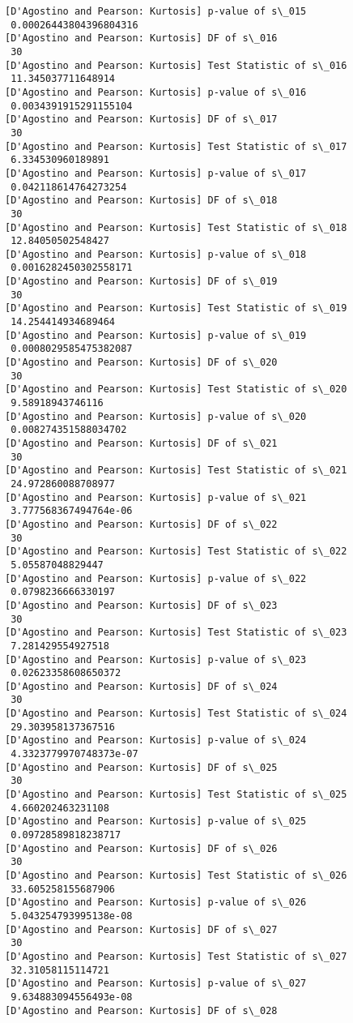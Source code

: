 \documentclass[11pt]{article}
\begin{document}
\begin{Verbatim}[commandchars=\\\{\}]
[D'Agostino and Pearson: Kurtosis] p-value of s\_015
 0.00026443804396804316
[D'Agostino and Pearson: Kurtosis] DF of s\_016
 30
[D'Agostino and Pearson: Kurtosis] Test Statistic of s\_016
 11.345037711648914
[D'Agostino and Pearson: Kurtosis] p-value of s\_016
 0.0034391915291155104
[D'Agostino and Pearson: Kurtosis] DF of s\_017
 30
[D'Agostino and Pearson: Kurtosis] Test Statistic of s\_017
 6.334530960189891
[D'Agostino and Pearson: Kurtosis] p-value of s\_017
 0.042118614764273254
[D'Agostino and Pearson: Kurtosis] DF of s\_018
 30
[D'Agostino and Pearson: Kurtosis] Test Statistic of s\_018
 12.84050502548427
[D'Agostino and Pearson: Kurtosis] p-value of s\_018
 0.0016282450302558171
[D'Agostino and Pearson: Kurtosis] DF of s\_019
 30
[D'Agostino and Pearson: Kurtosis] Test Statistic of s\_019
 14.254414934689464
[D'Agostino and Pearson: Kurtosis] p-value of s\_019
 0.0008029585475382087
[D'Agostino and Pearson: Kurtosis] DF of s\_020
 30
[D'Agostino and Pearson: Kurtosis] Test Statistic of s\_020
 9.58918943746116
[D'Agostino and Pearson: Kurtosis] p-value of s\_020
 0.008274351588034702
[D'Agostino and Pearson: Kurtosis] DF of s\_021
 30
[D'Agostino and Pearson: Kurtosis] Test Statistic of s\_021
 24.972860088708977
[D'Agostino and Pearson: Kurtosis] p-value of s\_021
 3.777568367494764e-06
[D'Agostino and Pearson: Kurtosis] DF of s\_022
 30
[D'Agostino and Pearson: Kurtosis] Test Statistic of s\_022
 5.05587048829447
[D'Agostino and Pearson: Kurtosis] p-value of s\_022
 0.0798236666330197
[D'Agostino and Pearson: Kurtosis] DF of s\_023
 30
[D'Agostino and Pearson: Kurtosis] Test Statistic of s\_023
 7.281429554927518
[D'Agostino and Pearson: Kurtosis] p-value of s\_023
 0.02623358608650372
[D'Agostino and Pearson: Kurtosis] DF of s\_024
 30
[D'Agostino and Pearson: Kurtosis] Test Statistic of s\_024
 29.303958137367516
[D'Agostino and Pearson: Kurtosis] p-value of s\_024
 4.3323779970748373e-07
[D'Agostino and Pearson: Kurtosis] DF of s\_025
 30
[D'Agostino and Pearson: Kurtosis] Test Statistic of s\_025
 4.660202463231108
[D'Agostino and Pearson: Kurtosis] p-value of s\_025
 0.09728589818238717
[D'Agostino and Pearson: Kurtosis] DF of s\_026
 30
[D'Agostino and Pearson: Kurtosis] Test Statistic of s\_026
 33.605258155687906
[D'Agostino and Pearson: Kurtosis] p-value of s\_026
 5.043254793995138e-08
[D'Agostino and Pearson: Kurtosis] DF of s\_027
 30
[D'Agostino and Pearson: Kurtosis] Test Statistic of s\_027
 32.31058115114721
[D'Agostino and Pearson: Kurtosis] p-value of s\_027
 9.634883094556493e-08
[D'Agostino and Pearson: Kurtosis] DF of s\_028

\end{Verbatim}
\end{document}
